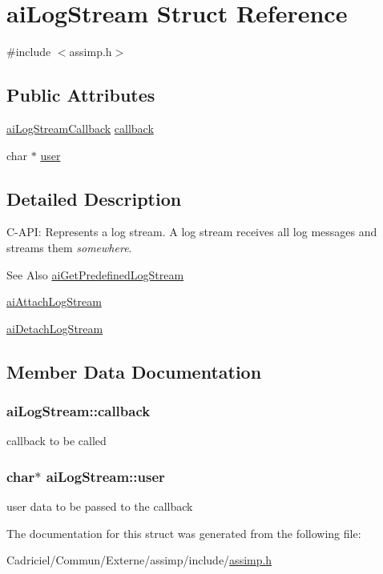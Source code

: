 \hypertarget{structai_log_stream}{\section{ai\-Log\-Stream Struct Reference}
\label{structai_log_stream}
}


{\ttfamily \#include $<$assimp.\-h$>$}

\subsection*{Public Attributes}
\begin{DoxyCompactItemize}
\item 
\hyperlink{assimp_8h_a8fd7aab231c7632030590290ca4f57d8}{ai\-Log\-Stream\-Callback} \hyperlink{structai_log_stream_ac73ae46eee54ba0f920d6abb97c33e97}{callback}
\item 
char $\ast$ \hyperlink{structai_log_stream_a3382042e4171a6dd5a71d7f98741f86e}{user}
\end{DoxyCompactItemize}


\subsection{Detailed Description}
C-\/\-A\-P\-I\-: Represents a log stream. A log stream receives all log messages and streams them {\itshape somewhere}. \begin{DoxySeeAlso}{See Also}
\hyperlink{assimp_8h_ad7e375d7b134ec590e812ad1f50eab94}{ai\-Get\-Predefined\-Log\-Stream} 

\hyperlink{assimp_8h_a75c5aa6027cb059e63b3dda005c9c149}{ai\-Attach\-Log\-Stream} 

\hyperlink{assimp_8h_a98ad05bb95e8f8157a97c133812a1597}{ai\-Detach\-Log\-Stream} 
\end{DoxySeeAlso}


\subsection{Member Data Documentation}
\hypertarget{structai_log_stream_ac73ae46eee54ba0f920d6abb97c33e97}{
\subsubsection[{callback}]{ ai\-Log\-Stream\-::callback}}\label{structai_log_stream_ac73ae46eee54ba0f920d6abb97c33e97}
callback to be called \hypertarget{structai_log_stream_a3382042e4171a6dd5a71d7f98741f86e}{
\subsubsection[{user}]{\setlength{\rightskip}{0pt plus 5cm}char$\ast$ ai\-Log\-Stream\-::user}}\label{structai_log_stream_a3382042e4171a6dd5a71d7f98741f86e}
user data to be passed to the callback 

The documentation for this struct was generated from the following file\-:\begin{DoxyCompactItemize}
\item 
Cadriciel/\-Commun/\-Externe/assimp/include/\hyperlink{assimp_8h}{assimp.\-h}\end{DoxyCompactItemize}
